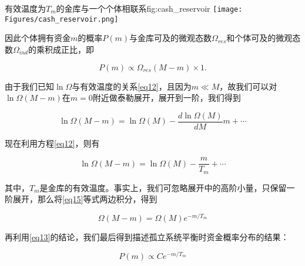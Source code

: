 \documentclass[tsinghuacite]{HustGraduPaper}
\begin{document}
			\vspace{1.5em} 
			
			\begin{generalfig}[htb]{有效温度为$T_m$的金库与一个个体相联系}{fig:cash_reservoir}
				\texttt{[image: Figures/cash\_reservoir.png]}
			\end{generalfig}
			
			\vspace{1.5em}  
	
			因此个体拥有资金$m$的概率$P(m)$与金库可及的微观态数$\Omega_{res}$和个体可及的微观态数$\Omega_{ind}$的乘积成正比，即
			
			\begin{equation}
				P(m) \propto \Omega_{res}(M-m) \times 1. \label{eq13}
			\end{equation}
	
			\vspace{1.5em}
	
			由于我们已知$\ln \Omega$与有效温度的关系\eqref{eq12}，且因为$m \ll M$，故我们可以对$\ln \Omega(M-m)$在$m=0$附近做泰勒展开，展开到一阶，我们得到
			
			
			\begin{equation}
				\ln \Omega(M-m) = \ln \Omega(M) - \frac{d \ln \Omega(M)}{dM} m + \cdots \label{eq14}
			\end{equation}
			
			\vspace{1.5em}
	
			现在利用方程\eqref{eq12}，则有
			
			\begin{equation}
				\ln \Omega(M-m) = \ln \Omega(M) -  \frac{m}{T_m} + \cdots \label{eq15}
			\end{equation}
			
			\vspace{1.5em}
	
			其中，$T_m$是金库的有效温度。事实上，我们可忽略展开中的高阶小量，只保留一阶展开，那么将\eqref{eq15}等式两边积分，得到
			
			\begin{equation}
				\Omega(M-m) = \Omega(M) e^{-m / T_m}  \label{eq16}
			\end{equation}
			
			\vspace{1.5em}
			
			再利用\eqref{eq13}的结论，我们最后得到描述孤立系统平衡时资金概率分布的结果：
			
			\begin{equation}
				P(m) \propto  C e^{-m / T_m}  \label{eq17}
			\end{equation}
			
\end{document}
